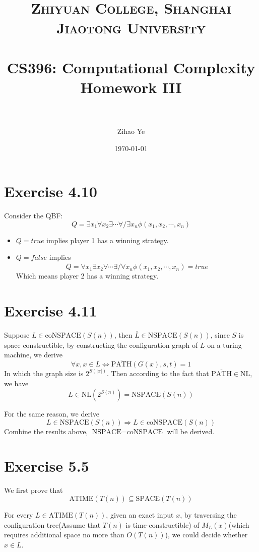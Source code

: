 \documentclass[paper=a4, fontsize=11pt]{scrartcl} %
\title{
\normalfont \normalsize
\textsc{Zhiyuan College, Shanghai Jiaotong University} \\ %
\horrule{0.5pt} \\[0.4cm] %
\huge CS396: Computational Complexity Homework III \\ %
\horrule{2pt} \\ %
}
\author{Zihao Ye} %
\date{\normalsize\today} %
\numberwithin{equation}{section} %
\numberwithin{figure}{section} %
\numberwithin{table}{section} %
\begin{document}
\maketitle %

\section*{Exercise 4.10}
Consider the QBF:
$$Q = \exists x_1 \forall x_2 \exists \cdots \forall/\exists x_n \phi(x_1, x_2, \cdots, x_n)$$

\begin{itemize}
	\item $Q = \textit{true}$ implies player 1 has a winning strategy.
	\item $Q = \textit{false}$ implies 
	$$\overline{Q} = \forall x_1 \exists x_2 \forall \cdots \exists/\forall x_n \phi(x_1, x_2, \cdots, x_n) = \textit{true} $$
	Which means player 2 has a winning strategy.
\end{itemize}


\section*{Exercise 4.11}
Suppose $L \in \textrm{coNSPACE}\left(S(n)\right)$, then $\overline{L} \in \textrm{NSPACE}\left(S(n)\right)$, since $S$ is space constructible, by constructing the configuration graph of $L$ on a turing machine, we derive 
$$\forall x, x\in L \iff  \overline{\textrm{PATH}}(G(x), s, t) = 1$$
In which the graph size is $2^{S(|x|)}$. Then according to the fact that $\overline{\textrm{PATH}} \in \textrm{NL}$, we have 
$$ L \in \textrm{NL}\left(2^{S(n)}\right) = \textrm{NSPACE}\left(S(n)\right) $$

For the same reason, we derive $$L \in \textrm{NSPACE}\left(S(n)\right) \Longrightarrow L \in \textrm{coNSPACE}\left(S(n) \right) $$
Combine the results above, $\textrm{NSPACE} = \textrm{coNSPACE}$ will be derived.

\section*{Exercise 5.5}
We first prove that $$\textrm{ATIME}(T(n)) \subseteq \textrm{SPACE}(T(n))$$

For every $L \in \textrm{ATIME}(T(n))$, given an exact input $x$, by traversing the configuration tree(Assume that $T(n)$ is time-constructible) of $M_L(x)$(which requires additional space no more than $O(T(n))$), we could decide whether $x\in L$.
\end{document}
